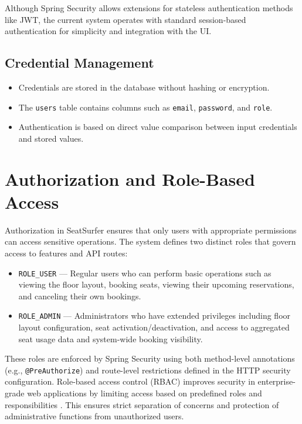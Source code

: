 \documentclass[12pt,a4paper]{report} %
\begin{document}
Although Spring Security allows extensions for stateless authentication methods like JWT, the current system operates with standard session-based authentication for simplicity and integration with the UI.

\subsection*{Credential Management}

\begin{itemize}
    \item Credentials are stored in the database without hashing or encryption.
    \item The \verb|users| table contains columns such as \verb|email|, \verb|password|, and \verb|role|.
    \item Authentication is based on direct value comparison between input credentials and stored values.
\end{itemize}

\section{Authorization and Role-Based Access}

Authorization in SeatSurfer ensures that only users with appropriate permissions can access sensitive operations. The system defines two distinct roles that govern access to features and API routes:

\begin{itemize}
    \item \verb|ROLE_USER| — Regular users who can perform basic operations such as viewing the floor layout, booking seats, viewing their upcoming reservations, and canceling their own bookings.
    \item \verb|ROLE_ADMIN| — Administrators who have extended privileges including floor layout configuration, seat activation/deactivation, and access to aggregated seat usage data and system-wide booking visibility.
\end{itemize}

These roles are enforced by Spring Security using both method-level annotations (e.g., \verb|@PreAuthorize|) and route-level restrictions defined in the HTTP security configuration. Role-based access control (RBAC) improves security in enterprise-grade web applications by limiting access based on predefined roles and responsibilities \cite{patel2020rbac}. This ensures strict separation of concerns and protection of administrative functions from unauthorized users.
\end{document}
